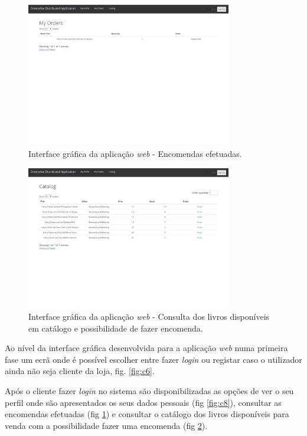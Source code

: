 \documentclass[12pt]{article}
\begin{document}
\begin{figure}[H]
    \centering
    \includegraphics[width=0.8\textwidth]{Web_Orders.png}
    \caption{Interface gráfica da aplicação \textit{web} - Encomendas efetuadas.}
    \label{fig:c9}
\end{figure}

\begin{figure}[H]
    \centering
    \includegraphics[width=0.8\textwidth]{Web_Catalog.png}
    \caption{Interface gráfica da aplicação \textit{web} - Consulta dos livros disponíveis em catálogo e possibilidade de fazer encomenda.}
    \label{fig:c10}
\end{figure}

Ao nível da interface gráfica desenvolvida para a aplicação \textit{web} numa primeira fase um ecrã onde é possível escolher entre fazer \textit{login} ou registar caso o utilizador ainda não seja cliente da loja, fig. \ref{fig:c6}.

Após o cliente fazer \textit{login} no sistema são disponibilizadas as opções de ver o seu perfil onde são apresentados os seus dados pessoais (fig \ref{fig:c8}), consultar as encomendas efetuadas (fig \ref{fig:c9}) e consultar o catálogo dos livros disponíveis para venda com a possibilidade fazer uma encomenda (fig \ref{fig:c10}).
\end{document}
